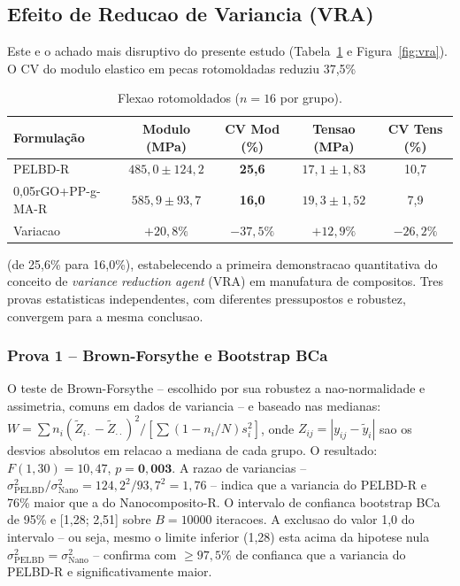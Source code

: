 \documentclass[11pt,a4paper,oneside]{article}
\begin{document}
\subsection{Efeito de Reducao de Variancia (VRA)}\label{sec:vra}

Este e o achado mais disruptivo do presente estudo (Tabela~\ref{tab:etapa2} e Figura~\ref{fig:vra}). O CV do modulo elastico em pecas rotomoldadas reduziu 37,5\%

\begin{table}[H]\centering
\caption{Flexao rotomoldados ($n{=}16$ por grupo).}\label{tab:etapa2}
\begin{tabular}{lcccc}
\toprule
{\bfseries Formulação} & {\bfseries Modulo (MPa)} & {\bfseries CV Mod (\%)} & {\bfseries Tensao (MPa)} & {\bfseries CV Tens (\%)} \\
\midrule
PELBD-R               & $485{,}0{\pm}124{,}2$ & {\bfseries 25,6} & $17{,}1{\pm}1{,}83$ & 10,7 \\
0,05rGO+PP-g-MA-R     & $585{,}9{\pm}93{,}7$  & {\bfseries 16,0} & $19{,}3{\pm}1{,}52$ & 7,9 \\
Variacao              & $+20{,}8\%$ & {\bfseries $-37{,}5\%$} & $+12{,}9\%$ & $-26{,}2\%$ \\
\bottomrule
\end{tabular}
\end{table}

(de 25,6\% para 16,0\%), estabelecendo a primeira demonstracao quantitativa do conceito de \textit{variance reduction agent} (VRA) em manufatura de compositos. Tres provas estatisticas independentes, com diferentes pressupostos e robustez, convergem para a mesma conclusao.

\subsubsection{Prova 1 -- Brown-Forsythe e Bootstrap BCa}

O teste de Brown-Forsythe -- escolhido por sua robustez a nao-normalidade e assimetria, comuns em dados de variancia -- e baseado nas medianas: $W{=}\sum n_i(\tilde{Z}_{i\cdot}{-}\tilde{Z}_{\cdot\cdot})^2/[\sum(1{-}n_i/N)s_i^2]$, onde $Z_{ij}{=}|y_{ij}{-}\tilde{y}_i|$ sao os desvios absolutos em relacao a mediana de cada grupo. O resultado: $F(1{,}30){=}10{,}47$, $p{=}\mathbf{0{,}003}$. A razao de variancias -- $\sigma^2_{\text{PELBD}}/\sigma^2_{\text{Nano}}{=}124{,}2^2/93{,}7^2{=}1{,}76$ -- indica que a variancia do PELBD-R e 76\% maior que a do Nanocomposito-R. O intervalo de confianca bootstrap BCa de 95\% e [1,28; 2,51] sobre $B{=}10000$ iteracoes. A exclusao do valor 1,0 do intervalo -- ou seja, mesmo o limite inferior (1,28) esta acima da hipotese nula $\sigma^2_{\text{PELBD}}{=}\sigma^2_{\text{Nano}}$ -- confirma com ${\ge}97{,}5\%$ de confianca que a variancia do PELBD-R e significativamente maior.
\end{document}
